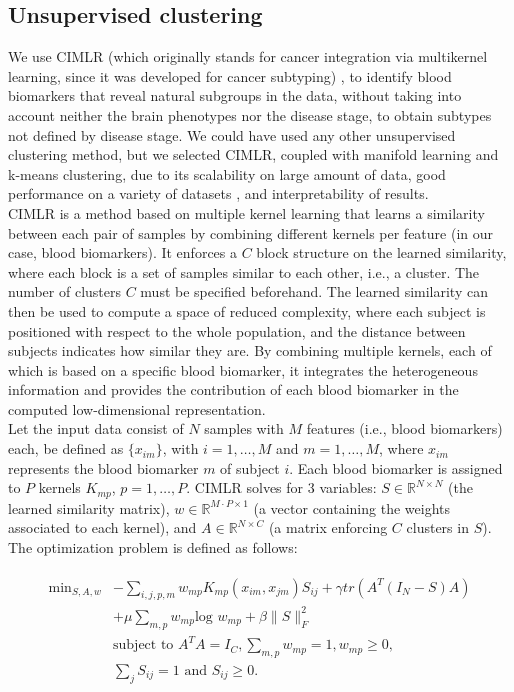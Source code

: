 \subsection{Unsupervised clustering}

We use CIMLR (which originally stands for cancer integration via multikernel learning, since it was developed for cancer subtyping) \cite{Ramazzotti2018,Wang2017a}, to identify blood biomarkers that reveal natural subgroups in the data, without taking into account neither the brain phenotypes nor the disease stage, to obtain subtypes not defined by disease stage. We could have used any other unsupervised clustering method, but we selected CIMLR, coupled with manifold learning and k-means clustering, due to its scalability on large amount of data, good performance on a variety of datasets \cite{Ramazzotti2018,Wang2017a}, and interpretability of results. \\

CIMLR is a method based on multiple kernel learning that learns a similarity between each pair of samples by combining different kernels per feature (in our case, blood biomarkers). It enforces a $C$ block structure on the learned similarity, where each block is a set of samples similar to each other, i.e., a cluster. The number of clusters $C$ must be specified beforehand. The learned similarity can then be used to compute a space of reduced complexity, where each subject is positioned with respect to the whole population, and the distance between subjects indicates how similar they are. By combining multiple kernels, each of which is based on a specific blood biomarker, it integrates the heterogeneous information and provides the contribution of each blood biomarker in the computed low-dimensional representation. \\

Let the input data consist of $N$ samples with $M$ features (i.e., blood biomarkers) each, be defined as $\{x_{im}\}$, with $i=1,\ldots, M$ and $m=1,\ldots, M$, where $x_{im}$ represents the blood biomarker $m$ of subject $i$. Each blood biomarker is assigned to $P$ kernels $K_{mp}$, $p=1,\ldots, P$. CIMLR solves for 3 variables: $S \in \mathbb{R}^{N\times N}$ (the learned similarity matrix), $w \in \mathbb{R}^{M\cdot P \times 1}$ (a vector containing the weights associated to each kernel), and $A \in \mathbb{R}^{N\times C}$ (a matrix enforcing $C$ clusters in $S$). The  optimization problem is defined as follows:

\begin{align}
\begin{split}\label{eq:1}
   \text{min}_{S,A,w} {}&-\sum_{i,j,p,m}w_{mp}K_{mp}(x_{im},x_{jm})S_{ij} + \gamma tr(A^T(I_N-S)A)\\
   {}&+ \mu\sum_{m,p} w_{mp} \text{log } w_{mp} + \beta \|S\|^2_F  \\
   {}&\text{subject to } A^TA = I_C, \sum_{m,p}  w_{mp} = 1,  w_{mp} \geq 0,\\
   {}&\sum_j S_{ij} = 1 \text{ and } S_{ij} \geq 0.
\end{split}
\end{align}


